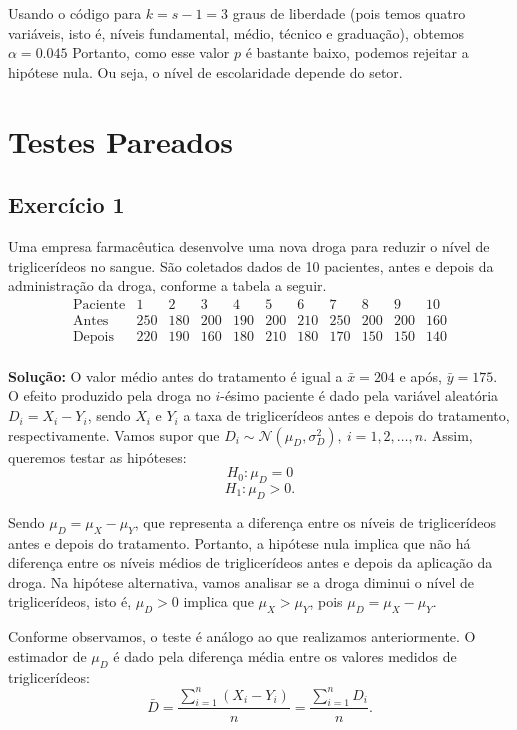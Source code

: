 \documentclass{article}
\begin{document}
Usando o código para $k = s-1 = 3$ graus de liberdade (pois temos quatro variáveis, isto é, níveis fundamental, médio, técnico e graduação), obtemos $\alpha = 0.045$
Portanto, como esse valor $p$ é bastante baixo, podemos rejeitar a hipótese nula. Ou seja, o nível de escolaridade depende do setor.

\section{Testes Pareados}
\subsection{Exercício 1}
Uma empresa farmacêutica desenvolve uma nova droga para reduzir o nível de triglicerídeos no sangue. São coletados dados de 10 pacientes, antes e depois da administração da droga, conforme a tabela a seguir.
    $$
    \begin{array}{c|c|c|c|c|c|c|c|c|c|c}
    \text{Paciente} & 1 & 2 & 3 & 4 & 5 & 6 & 7 & 8 & 9 & 10 \\
    \hline
    \text{Antes} & 250 & 180 & 200 & 190 & 200 & 210 & 250 & 200 & 200 & 160 \\
    \text{Depois} & 220 & 190 & 160 & 180 & 210 & 180 & 170 & 150 & 150 & 140 \\
    \end{array}
    $$

\vspace{0.5cm}
\textbf{Solução:}
O valor médio antes do tratamento é igual a $\bar{x} = 204$ e após, $\bar{y} = 175$. O efeito produzido pela droga no $i$-ésimo paciente é dado pela variável aleatória $D_i = X_i - Y_i$, sendo $X_i$ e $Y_i$ a taxa de triglicerídeos antes e depois do tratamento, respectivamente. Vamos supor que $D_i \sim \mathcal{N}(\mu_D, \sigma^2_D), \ i = 1, 2, \ldots, n$. Assim, queremos testar as hipóteses:
    $$
    H_0 : \mu_D = 0
    $$
    $$
    H_1 : \mu_D > 0.
    $$

Sendo $\mu_D = \mu_X - \mu_Y$, que representa a diferença entre os níveis de triglicerídeos antes e depois do tratamento.
Portanto, a hipótese nula implica que não há diferença entre os níveis médios de triglicerídeos antes e depois da aplicação da droga. Na hipótese alternativa, vamos analisar se a droga diminui o nível de triglicerídeos, isto é, $\mu_D > 0$ implica que $\mu_X > \mu_Y$, pois $\mu_D = \mu_X - \mu_Y$.

Conforme observamos, o teste é análogo ao que realizamos anteriormente. O estimador de $\mu_D$ é dado pela diferença média entre os valores medidos de triglicerídeos:
    $$
    \bar{D} = \frac{\sum_{i=1}^n (X_i - Y_i)}{n} = \frac{\sum_{i=1}^n D_i}{n}.
    $$
\end{document}
